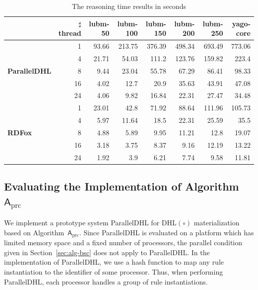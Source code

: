 \begin{table}
\centering
\caption{The reasoning time results in seconds}
{\setlength{\tabcolsep}{1.5mm}
\begin{tabular}{|l|r|r|r|r|r|r|r|}
\hline
&\small$\sharp$thread&lubm-50&lubm-100&lubm-150&lubm-200&lubm-250&yago-core\\
\hline
\multirow{5}{*}{ \small{\textbf{ParallelDHL}}}&1&93.66&213.75&376.39&498.34&693.49&773.06\\
                    &4&21.71&54.03&111.2&123.76&159.82&223.4\\
                    &8&9.44&23.04&55.78&67.29&86.41&98.33\\
                    &16&4.02&12.7&20.9&35.63&43.91&47.08\\
                    &24&4.06&9.82&16.84&22.31&27.47&34.48\\
\hline
\multirow{5}{*}{ \small{\textbf{RDFox}}}&1&23.01&42.8&71.92&88.64&111.96&105.73\\
                    &4&5.97&11.64&18.5&22.31&25.59&35.5\\
                    &8&4.88&5.89&9.95&11.21&12.8&19.07\\
                    &16&3.18&3.75&8.37&9.16&12.19&13.22\\
                    &24&1.92&3.9&6.21&7.74&9.58&11.81\\
\hline
\end{tabular}}
\label{tab:result}
\end{table}


\subsection{Evaluating the Implementation of Algorithm~$\mathsf{A}_{\text{prc}}$}

We implement a prototype system ParallelDHL for DHL$(\circ)$ materialization
based on Algorithm~$\mathsf{A}_{\text{prc}}$. Since ParallelDHL is
evaluated on a
platform which has limited memory space and a fixed number of processors,
the parallel condition given in Section~\ref{sec:alg-bsc} does not apply to ParallelDHL.
In the implementation of ParallelDHL, we use a hash function to map any rule instantiation
to the identifier of some processor. Thus, when performing ParallelDHL,
each processor handles a group of rule instantiations.

